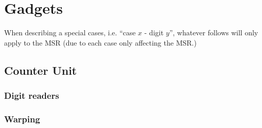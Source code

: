 \section{Gadgets}
\label{gadgets}



\newcommand{\warpunit}{{\tt Warp\_Unit}}
\newcommand{\prewarp}{{\tt Pre\_Warp}}
\newcommand{\firstwarp}{{\tt First\_Warp}}
\newcommand{\warpbridge}{{\tt Warp\_Bridge}}
\newcommand{\secondwarp}{{\tt Second\_Warp}}
\newcommand{\postwarp}{{\tt Post\_Warp}}

\newcommand{\dtop}{{\tt Digit\_Top}}
\newcommand{\dwriter}{{\tt Digit\_Writer}}
\newcommand{\dreader}{{\tt Digit\_Reader}}

\newcommand{\returnfromdonereadnextrow}{{\tt Return\_From\_Digit1\_Read\_Next\_Row}}
\newcommand{\returnfromdtworeadnextrow}{{\tt Return\_From\_Digit2\_Read\_Next\_Row}}
\newcommand{\returnfromdthreereadnextrow}{{\tt Return\_From\_Digit3\_Read\_Next\_Row}}

\newcommand{\returnfromdonereaddtwo}{{\tt Return\_From\_Digit1\_Read\_Digit2}}
\newcommand{\returnfromdonereaddtwocasetwo}{{\tt Return\_From\_Digit1\_Read\_Digit2\_Case2}}
\newcommand{\returnfromdtworeaddthree}{{\tt Return\_From\_Digit2\_Read\_Digit3}}
\newcommand{\returnfromdthreereaddone}{{\tt Return\_From\_Digit3\_Read\_Digit1}}

\newcommand{\inc}{{\tt carry}}

\newcommand{\dtopdonecasetwo}{{\tt Digit\_Top\_Digit1\_Case2}}
\newcommand{\dtopdtwocasetwo}{{\tt Digit\_Top\_Digit2\_Case2}}
\newcommand{\dtopdthreecasethree}{{\tt Digit\_Top\_Digit3\_Case3}}

When describing a special cases, i.e. ``case $x$ - digit $y$'', whatever follows
will only apply to the MSR (due to each case only affecting the MSR.)

\subsection{ Counter Unit }



    \subsubsection{ Digit readers }

    \subsubsection{ Warping }

